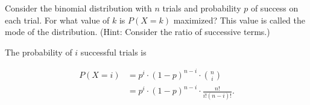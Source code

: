 \documentclass[answers]{exam}
\begin{document}
\begin{questions}

\question[10]
Consider the binomial distribution with \(n\) trials and probability \(p\) of
success on each trial. For what value of \(k\) is \(P(X=k)\) maximized? This
value is called the mode of the distribution. (Hint: Consider the ratio of
successive terms.)

\begin{solution}
The probability of $i$ successful trials is

\begin{align*}
P(X=i) &= p^{i} \cdot (1-p)^{n-i} \cdot \binom{n}{i} \\ 
&= p^{i} \cdot (1-p)^{n-i} \cdot \frac{n!}{i!(n-i)!}
.\end{align*}


\end{solution}
\end{questions}
\end{document}
